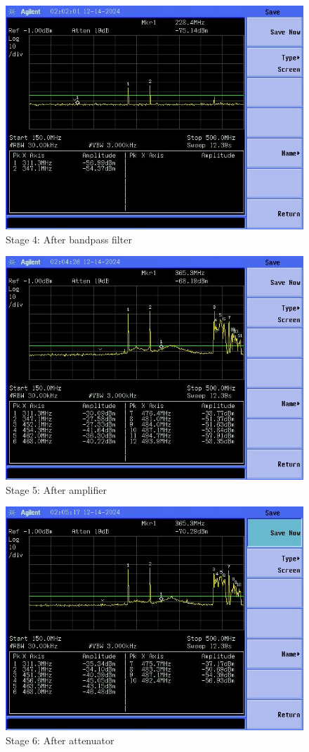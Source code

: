 \documentclass[letterpaper,12pt]{article}
\begin{document}
\begin{figure}[H]
	\begin{centering}
		\includegraphics[width=0.5\columnwidth]{figures/receiver_spectra/4.bpf}
		\caption{Stage 4: After bandpass filter}
	\end{centering}
\end{figure}

\begin{figure}[H]
	\begin{centering}
		\includegraphics[width=0.5\columnwidth]{figures/receiver_spectra/5.amp}
		\caption{Stage 5: After amplifier}
	\end{centering}
\end{figure}

\begin{figure}[H]
	\begin{centering}
		\includegraphics[width=0.5\columnwidth]{figures/receiver_spectra/6.attenuator}
		\caption{Stage 6: After attenuator}
	\end{centering}
\end{figure}
\end{document}
